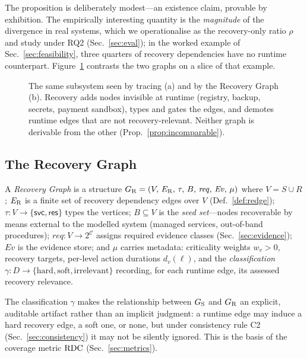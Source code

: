 The proposition is deliberately modest---an existence claim, provable by exhibition. The empirically interesting quantity is the \emph{magnitude} of the divergence in real systems, which we operationalise as the recovery-only ratio $\rho$ and study under RQ2 (Sec.~\ref{sec:eval}); in the worked example of Sec.~\ref{sec:feasibility}, three quarters of recovery dependencies have no runtime counterpart. Figure~\ref{fig:runtimevsrecovery} contrasts the two graphs on a slice of that example.

\begin{figure}[t]
  \centering
  
  \caption{The same subsystem seen by tracing (a) and by the Recovery Graph (b). Recovery adds nodes invisible at runtime (registry, backup, secrets, payment sandbox), types and gates the edges, and demotes runtime edges that are not recovery-relevant. Neither graph is derivable from the other (Prop.~\ref{prop:incomparable}).}
  \label{fig:runtimevsrecovery}
\end{figure}

\subsection{The Recovery Graph}

\begin{definition}
\label{def:rg}
A \emph{Recovery Graph} is a structure
$G_{\mathrm{R}} = (V,\, E_{\mathrm{R}},\, \tau,\, B,\, \mathit{req},\, \mathit{Ev},\, \mu)$
where $V = S \cup R$; $E_{\mathrm{R}}$ is a finite set of recovery dependency edges over $V$ (Def.~\ref{def:redge}); $\tau : V \to \{\textsf{svc}, \textsf{res}\}$ types the vertices; $B \subseteq V$ is the \emph{seed set}---nodes recoverable by means external to the modelled system (managed services, out-of-band procedures); $\mathit{req} : V \to 2^{\mathcal{C}}$ assigns required evidence classes (Sec.~\ref{sec:evidence}); $\mathit{Ev}$ is the evidence store; and $\mu$ carries metadata: criticality weights $w_v > 0$, recovery targets, per-level action durations $d_v(\ell)$, and the \emph{classification} $\gamma : D \to \{\text{hard}, \text{soft}, \text{irrelevant}\}$ recording, for each runtime edge, its assessed recovery relevance.
\end{definition}

The classification $\gamma$ makes the relationship between $G_{\mathrm{S}}$ and $G_{\mathrm{R}}$ an explicit, auditable artifact rather than an implicit judgment: a runtime edge may induce a hard recovery edge, a soft one, or none, but under consistency rule C2 (Sec.~\ref{sec:consistency}) it may not be silently ignored. This is the basis of the coverage metric $\mathrm{RDC}$ (Sec.~\ref{sec:metrics}).

